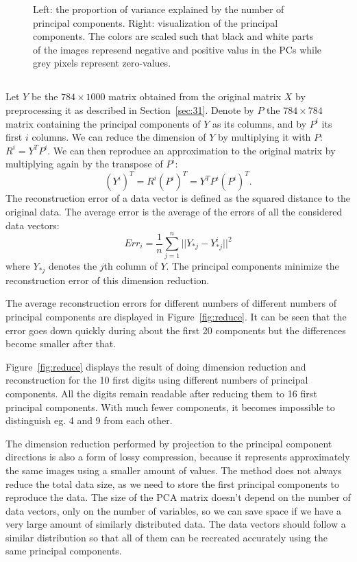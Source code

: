 \documentclass{article}
\begin{document}
\begin{figure}
	\caption{Left: the proportion of variance explained by the number of principal components.
	Right: visualization of the principal components.
The colors are scaled such that black and white parts of the images represend negative and positive valus in the PCs while grey pixels represent zero-values.}\label{fig:pcavar}
\end{figure}

\subsection{}
Let $Y$ be the $784\times 1000$ matrix obtained from the original matrix $X$ by preprocessing it as described in Section~\ref{sec:31}.
Denote by $P$ the $784\times 784$ matrix containing the principal components of $Y$ as its columns, and by $P^i$ its first $i$ columns.
We can reduce the dimension of $Y$ by multiplying it with $P$: $R^i=Y^TP^i$.
We can then reproduce an approximation to the original matrix by multiplying again by the transpose of $P^i$: $$(Y^i)^T=R^i(P^i)^T=Y^TP^i(P^i)^T.$$
The reconstruction error of a data vector is defined as the squared distance to the original data. The average error is the average of the errors of all the considered data vectors:
$$Err_i = \frac{1}{n}\sum_{j=1}^{n}||Y_{*j}-Y^i_{*j}||^2$$ where $Y_{*j}$ denotes the $j$th column of $Y$. The principal components minimize the reconstruction error of this dimension reduction.

The average reconstruction errors for different numbers of different numbers of principal components are displayed in Figure~\ref{fig:reduce}.
It can be seen that the error goes down quickly during about the first 20 components but the differences become smaller after that.

Figure~\ref{fig:reduce} displays the result of doing dimension reduction and reconstruction for the 10 first digits using different numbers of principal components.
All the digits remain readable after reducing them to 16 first principal components.
With much fewer components, it becomes impossible to distinguish eg. 4 and 9 from each other.

The dimension reduction performed by projection to the principal component directions is also a form of lossy compression, because it represents approximately the same images using a smaller amount of values.
The method does not always reduce the total data size, as we need to store the first principal components to reproduce the data.
The size of the PCA matrix doesn't depend on the number of data vectors, only on the number of variables, so we can save space if we have a very large amount of similarly distributed data.
The data vectors should follow a similar distribution so that all of them can be recreated accurately using the same principal components.
\end{document}
